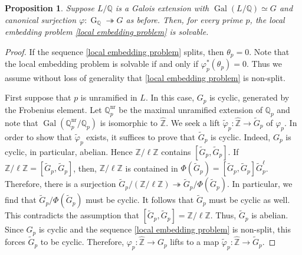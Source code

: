\documentclass[11pt,reqno]{amsart}
\newtheorem{proposition}[theorem]{Proposition}
\newcommand{\Z}{\mathbb{Z}}
\newcommand{\Q}{\mathbb{Q}}
\newcommand{\op}[1]{\operatorname{#1}}
\numberwithin{equation}{section}
\begin{document}
\begin{proposition}\label{local extension is solvable}
     Suppose \( L/\mathbb{Q} \) is a Galois extension with \(\op{Gal}(L/\Q)\simeq  G \) and canonical surjection \( \varphi : \op{G}_{\Q}\twoheadrightarrow G\) as before. Then, for every prime \( p \), the local embedding problem \eqref{local embedding problem} is solvable. 
\end{proposition}
\begin{proof}
   If the sequence \eqref{local embedding problem} splits, then $\theta_p=0$. Note that the local embedding problem is solvable if and only if $\varphi_p^*(\theta_p)=0$. Thus we assume without loss of generality that \eqref{local embedding problem} is non-split.  \par First suppose that \( p \) is unramified in \( L \). In this case, $G_p$ is cyclic, generated by the Frobenius element. Let $\Q_p^{\op{nr}}$ be the maximal unramified extension of $\Q_p$ and note that $ \op{Gal}(\Q_p^{\op{nr}}/\Q_p)$ is isomorphic to $\widehat{\Z}$. We seek a lift $\widetilde{\varphi}_p: \widehat{\mathbb{Z}} \rightarrow \widetilde{G}_p$ of $\varphi_p$. In order to show that $\widetilde{\varphi}_p$ exists, it suffices to prove that $\widetilde{G}_p$ is cyclic. Indeed, $G_p$ is cyclic, in particular, abelian. Hence $\Z/\ell\Z$ contains $[\widetilde{G}_p, \widetilde{G}_p]$. If $\Z/\ell\Z=[\widetilde{G}_p, \widetilde{G}_p]$, then, $\Z/\ell\Z$ is contained in $\Phi(\widetilde{G}_p)=[\widetilde{G}_p, \widetilde{G}_p]\widetilde{G}_p^\ell$. Therefore, there is a surjection $\widetilde{G}_p / \left(\Z/\ell\Z\right) \twoheadrightarrow \widetilde{G}_p / \Phi(\widetilde{G}_p)$. In particular, we find that $\widetilde{G}_p / \Phi(\widetilde{G}_p)$ must be cyclic. It follows that $\widetilde{G}_p$ must be cyclic as well. This contradicts the assumption that $[\widetilde{G}_p, \widetilde{G}_p]=\Z/\ell\Z$. Thus, $\widetilde{G}_p$ is abelian. Since $G_p$ is cyclic and the sequence \eqref{local embedding problem} is non-split, this forces $\widetilde{G}_p$ to be cyclic. Therefore, $\varphi_p: \widehat{\Z}\rightarrow G_p$ lifts to a map $\widetilde{\varphi}_p:\widehat{\Z}\rightarrow \widetilde{G}_p$.


\end{proof}
\end{document}

